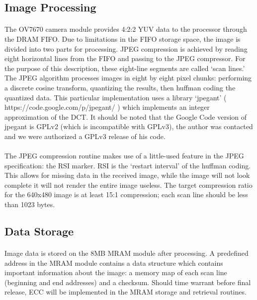 \documentclass[10pt]{article}
\begin{document}
\subsection*{Image Processing}

\paragraph*{}The OV7670 camera module provides 4:2:2 YUV data to the processor through the DRAM FIFO.  Due to limitations in the FIFO storage space, the image is divided into two parts for processing.  JPEG compression is achieved by reading eight horizontal lines from the FIFO and passing to the JPEG compressor.  For the purpose of this description, these eight-line segments are called `scan lines.'  The JPEG algorithm processes images in eight by eight pixel chunks: performing a discrete cosine transform, quantizing the results, then huffman coding the quantized data.  This particular implementation uses a library `jpegant' ( https://code.google.com/p/jpegant/ ) which implements an integer approximation of the DCT.  It should be noted that the Google Code version of jpegant is GPLv2 (which is incompatible with GPLv3), the author was contacted and we were authorized a GPLv3 release of his code.
\paragraph*{}The JPEG compression routine makes use of a little-used feature in the JPEG specification: the RSI marker.  RSI is the `restart interval' of the huffman coding.  This allows for missing data in the received image, while the image will not look complete it will not render the entire image useless.  The target compression ratio for the 640x480 image is at least 15:1 compression; each scan line should be less than 1023 bytes.

\subsection*{Data Storage}

\paragraph*{}Image data is stored on the 8MB MRAM module after processing.  A predefined address in the MRAM module contains a data structure which contains important information about the image: a memory map of each scan line (beginning and end addresses) and a checksum.  Should time warrant before final release, ECC will be implemented in the MRAM storage and retrieval routines.
\end{document}
